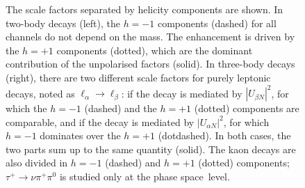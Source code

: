 \begin{figure}[t]
	\centering
	{\resizebox{\linewidth}{!}{}}
	\caption{The scale factors separated by helicity components are shown.
		In two-body decays (left), the $h=-1$ components (dashed) for all channels %
		do not depend on the mass.
		The enhancement is driven by the $h=+1$ components (dotted), %
		which are the dominant contribution of the unpolarised factors (solid).
		In three-body decays (right), there are two different scale factors for purely leptonic decays, noted as $\ell_\alpha \to \ell_\beta$: %
		if the decay is mediated by $|U_{\beta N}|^2$, for which the $h=-1$ (dashed) and the $h=+1$ (dotted) components %
		are comparable, and if the decay is mediated by $|U_{\alpha N}|^2$, %
		for which $h=-1$ dominates over the $h=+1$ (dotdashed).
		In both cases, the two parts sum up to the same quantity (solid).
		The kaon decays are also divided in $h=-1$ (dashed) and $h=+1$ (dotted) components; $\tau^+\to\nu\pi^+\pi^0$ is %
		studied only at the phase space~level.}
	\label{fig:scale}
\end{figure}

